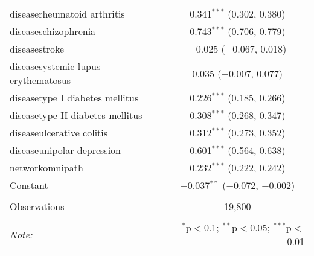\begin{table}[!htbp]
\begin{tabular}{@{\extracolsep{5pt}}lc}
  diseaserheumatoid arthritis & 0.341$^{***}$ (0.302, 0.380) \\ 
  diseaseschizophrenia & 0.743$^{***}$ (0.706, 0.779) \\ 
  diseasestroke & $-$0.025 ($-$0.067, 0.018) \\ 
  diseasesystemic lupus erythematosus & 0.035 ($-$0.007, 0.077) \\ 
  diseasetype I diabetes mellitus & 0.226$^{***}$ (0.185, 0.266) \\ 
  diseasetype II diabetes mellitus & 0.308$^{***}$ (0.268, 0.347) \\ 
  diseaseulcerative colitis & 0.312$^{***}$ (0.273, 0.352) \\ 
  diseaseunipolar depression & 0.601$^{***}$ (0.564, 0.638) \\ 
  networkomnipath & 0.232$^{***}$ (0.222, 0.242) \\ 
  Constant & $-$0.037$^{**}$ ($-$0.072, $-$0.002) \\ 
 \hline \\[-1.8ex] 
Observations & 19,800 \\ 
\hline 
\hline \\[-1.8ex] 
\textit{Note:}  & \multicolumn{1}{r}{$^{*}$p$<$0.1; $^{**}$p$<$0.05; $^{***}$p$<$0.01} \\ 
\end{tabular} 
\end{table} 
